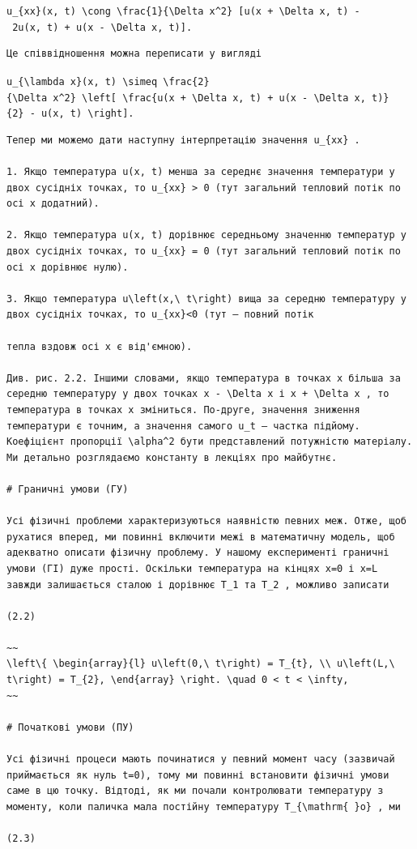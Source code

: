 \documentclass[
  ukrainian,
]{article}
\begin{document}
\texttt{u\_\{xx\}(x,\ t)\ \textbackslash{}cong\ \textbackslash{}frac\{1\}\{\textbackslash{}Delta\ x\^{}2\}\ {[}u(x\ +\ \textbackslash{}Delta\ x,\ t)\ -\ 2u(x,\ t)\ +\ u(x\ -\ \textbackslash{}Delta\ x,\ t){]}.}

\begin{verbatim}
Це співвідношення можна переписати у вигляді
\end{verbatim}

\texttt{u\_\{\textbackslash{}lambda\ x\}(x,\ t)\ \textbackslash{}simeq\ \textbackslash{}frac\{2\}\{\textbackslash{}Delta\ x\^{}2\}\ \textbackslash{}left{[}\ \textbackslash{}frac\{u(x\ +\ \textbackslash{}Delta\ x,\ t)\ +\ u(x\ -\ \textbackslash{}Delta\ x,\ t)\}\{2\}\ -\ u(x,\ t)\ \textbackslash{}right{]}.}

\begin{verbatim}
Тепер ми можемо дати наступну інтерпретацію значення u_{xx} .

1. Якщо температура u(x, t) менша за середнє значення температури у двох сусідніх точках, то u_{xx} > 0 (тут загальний тепловий потік по осі x додатний).

2. Якщо температура u(x, t) дорівнює середньому значенню температур у двох сусідніх точках, то u_{xx} = 0 (тут загальний тепловий потік по осі x дорівнює нулю).

3. Якщо температура u\left(x,\ t\right) вища за середню температуру у двох сусідніх точках, то u_{xx}<0 (тут — повний потік

тепла вздовж осі x є від'ємною).

Див. рис. 2.2. Іншими словами, якщо температура в точках x більша за середню температуру у двох точках x - \Delta x і x + \Delta x , то температура в точках x зміниться. По-друге, значення зниження температури є точним, а значення самого u_t — частка підйому. Коефіцієнт пропорції \alpha^2 бути представлений потужністю матеріалу. Ми детально розглядаємо константу в лекціях про майбутнє.

# Граничні умови (ГУ)

Усі фізичні проблеми характеризуються наявністю певних меж. Отже, щоб рухатися вперед, ми повинні включити межі в математичну модель, щоб адекватно описати фізичну проблему. У нашому експерименті граничні умови (ГІ) дуже прості. Оскільки температура на кінцях x=0 і x=L завжди залишається сталою і дорівнює T_1 та T_2 , можливо записати

(2.2)

~~
\left\{ \begin{array}{l} u\left(0,\ t\right) = T_{t}, \\ u\left(L,\ t\right) = T_{2}, \end{array} \right. \quad 0 < t < \infty,
~~

# Початкові умови (ПУ)

Усі фізичні процеси мають починатися у певний момент часу (зазвичай приймається як нуль t=0), тому ми повинні встановити фізичні умови саме в цю точку. Відтоді, як ми почали контролювати температуру з моменту, коли паличка мала постійну температуру T_{\mathrm{ }o} , ми

(2.3)
\end{verbatim}
\end{document}
